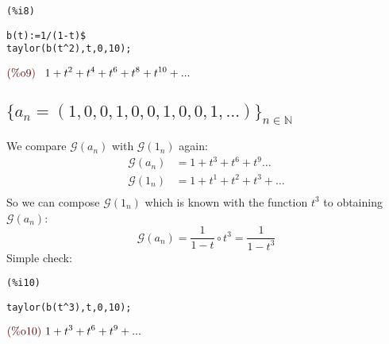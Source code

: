 \noindent
\begin{minipage}[t]{8ex}{\color{red}\bf
\begin{verbatim}
(%i8) 
\end{verbatim}}
\end{minipage}
\begin{minipage}[t]{\textwidth}{\color{blue}
\begin{verbatim}
b(t):=1/(1-t)$
taylor(b(t^2),t,0,10);
\end{verbatim}}
\end{minipage}
\begin{math}\displaystyle
\parbox{8ex}{\color{labelcolor}(\%o9) }
1+{t}^{2}+{t}^{4}+{t}^{6}+{t}^{8}+{t}^{10}+...
\end{math}

\subsection{$\{a_n = (1,0,0,1,0,0,1,0,0,1,\ldots)\}_{n\in \mathbb{N} }$}

We compare $\mathcal{G}(a_n) $ with $\mathcal{G} (1_n)$ again:
\begin{displaymath}
  \begin{split}
    \mathcal{G} (a_n) &= 1 + t^3 + t^6 + t^9\ldots \\
    \mathcal{G} (1_n) &= 1 + t^1 + t^2 + t^3 + \ldots \\
  \end{split}
\end{displaymath}
So we can compose $\mathcal{G} (1_n)$ which is known with the function
$t^3$ to obtaining $\mathcal{G} (a_n)$:
\begin{displaymath}
  \mathcal{G} (a_n) =  \frac{1}{1-t} \circ t^3 =  \frac{1}{1-t^3} 
\end{displaymath}
Simple check:

\noindent
\begin{minipage}[t]{8ex}{\color{red}\bf
\begin{verbatim}
(%i10) 
\end{verbatim}}
\end{minipage}
\begin{minipage}[t]{\textwidth}{\color{blue}
\begin{verbatim}
taylor(b(t^3),t,0,10);
\end{verbatim}}
\end{minipage}
\begin{math}\displaystyle
\parbox{8ex}{\color{labelcolor}(\%o10) }
1+{t}^{3}+{t}^{6}+{t}^{9}+...
\end{math}

